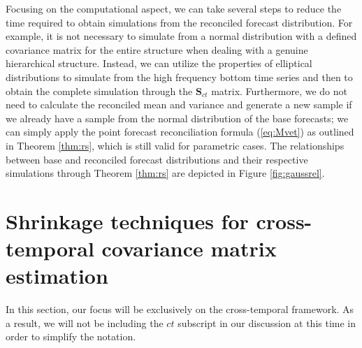 \documentclass[a4paper,11pt]{article}
\newcommand{\Svet}{\bm{S}}
\theoremstyle{definition}
\begin{document}


Focusing on the computational aspect, we can take several steps to reduce the time required to obtain simulations from the reconciled forecast distribution. For example, it is not necessary to simulate from a normal distribution with a defined covariance matrix for the entire structure when dealing with a genuine hierarchical structure. Instead, we can utilize the properties of elliptical distributions to simulate from the high frequency bottom time series and then to obtain the complete simulation through the $\Svet_{ct}$ matrix. Furthermore, we do not need to calculate the reconciled mean and variance and generate a new sample if we already have a sample from the normal distribution of the base forecasts; we can simply apply the point forecast reconciliation formula (\ref{eq:Mvet}) as outlined in Theorem \ref{thm:rs}, which is still valid for parametric cases. The relationships between base and reconciled forecast distributions and their respective simulations through Theorem \ref{thm:rs} are depicted in Figure \ref{fig:gaussrel}.


\section{Shrinkage techniques for cross-temporal covariance matrix estimation}\label{sec:shrtech}

In this section, our focus will be exclusively on the cross-temporal framework. As a result, we will not be including the $ct$ subscript in our discussion at this time in order to simplify the notation.
\end{document}
